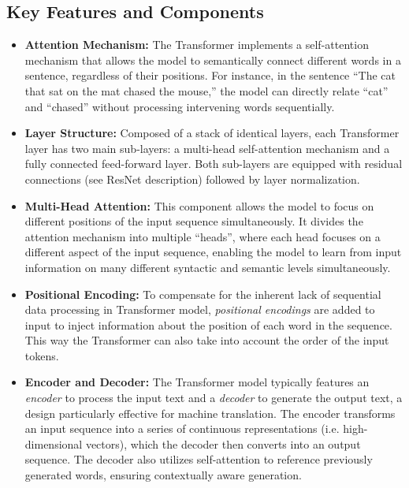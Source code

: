 \subsection{Key Features and Components}

\begin{itemize}
	\item \textbf{Attention Mechanism:} The Transformer implements a self-attention mechanism that allows the model to semantically connect different words in a sentence, regardless of their positions. For instance, in the sentence ``The cat that sat on the mat chased the mouse,'' the model can directly relate ``cat'' and ``chased'' without processing intervening words sequentially.

	\item \textbf{Layer Structure:} Composed of a stack of identical layers, each Transformer layer has two main sub-layers: a multi-head self-attention mechanism and a fully connected feed-forward layer. Both sub-layers are equipped with residual connections (see ResNet description) followed by layer normalization.

	\item \textbf{Multi-Head Attention:} This component allows the model to focus on different positions of the input sequence simultaneously.
	      It divides the attention mechanism into multiple ``heads'', where each head focuses on a different aspect of the input sequence, enabling the model to learn from input information on many different syntactic and semantic levels simultaneously.

	\item \textbf{Positional Encoding:} To compensate for the inherent lack of sequential data processing in Transformer model, \textit{positional encodings} are added to input to inject information about the position of each word in the sequence.
	      This way the Transformer can also take into account the order of the input tokens.

	\item \textbf{Encoder and Decoder:} The Transformer model typically features an \textit{encoder} to process the input text and a \textit{decoder} to generate the output text, a design particularly effective for machine translation.
	      The encoder transforms an input sequence into a series of continuous representations (i.e. high-dimensional vectors), which the decoder then converts into an output sequence.
	      The decoder also utilizes self-attention to reference previously generated words, ensuring contextually aware generation.

\end{itemize}



